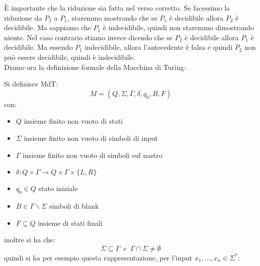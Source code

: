 \documentclass[a4paper,12pt, oneside]{book}
\begin{document}
È importante che la riduzione sia fatta nel verso corretto. Se facessimo la riduzione da $P_2$ a $P_1$,
staremmo mostrando che se $P_1$ è decidibile allora $P_2$ è decidibile. Ma sappiamo che $P_1$ è
indecidibile, quindi non staremmo dimostrando niente.
Nel caso contrario stiamo invece dicendo che se $P_2$ è decidibile allora $P_1$ è decidibile. Ma essendo
$P_1$ indecidibile, allora l'antecedente è falsa e quindi $P_2$ non può essere decidibile, quindi è
indecidibile.\\
Diamo ora la definizione formale della Macchina di Turing:
\begin{definizione}
Si definisce MdT: 
$$M=(Q,\Sigma,\Gamma,\delta,q_0,B,F)$$
con:
\begin{itemize}
\item $Q$ insieme finito non vuoto di stati
\item $\Sigma$ insieme finito non vuoto di simboli di input
\item $\Gamma$ insieme finito non vuoto di simboli sul nastro
\item $\delta:Q\times\Gamma\to Q\times\Gamma\times\{L,R\}$
\item $q_0\in Q$ stato iniziale
\item $B\in\Gamma\backslash\Sigma$ simboli di blank
\item $F\subseteq Q$ insieme di stati finali
\end{itemize}
inoltre si ha che:
$$\Sigma\subseteq \Gamma\,\,\,e\,\,\,\Gamma\cap\Sigma\neq\emptyset$$
quindi si ha per esempio questa rappresentazione, per l'input $x_1,...,x_n\in\Sigma^*$:
\begin{center}


\end{center}
\end{definizione}
\end{document}
